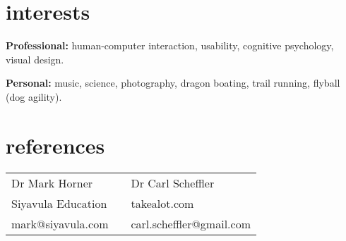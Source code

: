 \documentclass[]{friggeri-cv} %
\begin{document}
\section{interests}

\textbf{Professional:} human-computer interaction, usability, cognitive psychology, visual design.

\textbf{Personal:} music, science, photography, dragon boating, trail running, flyball (dog agility).


\section{references}

\begin{table}[h]
\begin{tabular}{lll}
 Dr Mark Horner  &  \hspace{3em}  & Dr Carl Scheffler \\
Siyavula Education &    & takealot.com\\
mark@siyavula.com &    & carl.scheffler@gmail.com \\
\end{tabular}
\end{table}
\end{document}
